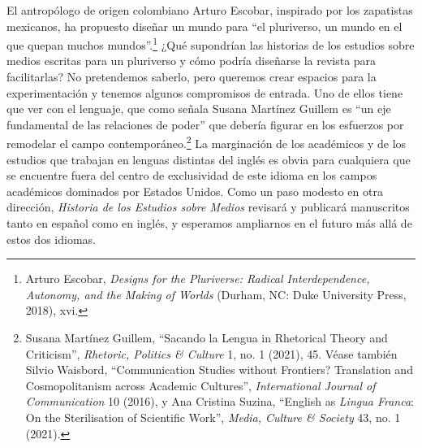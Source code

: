 \documentclass{tufte-handout}
\begin{document}
El antropólogo de origen colombiano Arturo Escobar, inspirado por los
zapatistas mexicanos, ha propuesto diseñar un mundo para ``el
pluriverso, un mundo en el que quepan muchos mundos''.\footnote{Arturo
  Escobar, \emph{Designs for the Pluriverse: Radical Interdependence,
  Autonomy, and the Making of Worlds} (Durham, NC: Duke University
  Press, 2018), xvi.} ¿Qué supondrían las historias de los estudios
sobre medios escritas para un pluriverso y cómo podría diseñarse la
revista para facilitarlas? No pretendemos saberlo, pero queremos crear
espacios para la experimentación y tenemos algunos compromisos de
entrada. Uno de ellos tiene que ver con el lenguaje, que como señala
Susana Martínez Guillem es ``un eje fundamental de las relaciones de
poder'' que debería figurar en los esfuerzos por remodelar el campo
contemporáneo.\footnote{Susana Martínez Guillem, ``Sacando la Lengua in
  Rhetorical Theory and Criticism'', \emph{Rhetoric, Politics \&
  Culture} 1, no. 1 (2021), 45. Véase también Silvio Waisbord,
  ``Communication Studies without Frontiers? Translation and
  Cosmopolitanism across Academic Cultures'', \emph{International
  Journal of Communication} 10 (2016), y Ana Cristina Suzina, ``English
  as \emph{Lingua Franca}: On the Sterilisation of Scientific Work'',
  \emph{Media, Culture \& Society} 43, no. 1 (2021).} La marginación de
los académicos y de los estudios que trabajan en lenguas distintas del
inglés es obvia para cualquiera que se encuentre fuera del centro de
exclusividad de este idioma en los campos académicos dominados por
Estados Unidos. Como un paso modesto en otra dirección, \emph{Historia
de los Estudios sobre Medios} revisará y publicará manuscritos tanto en
español como en inglés, y esperamos ampliarnos en el futuro más allá de
estos dos idiomas.
\end{document}
